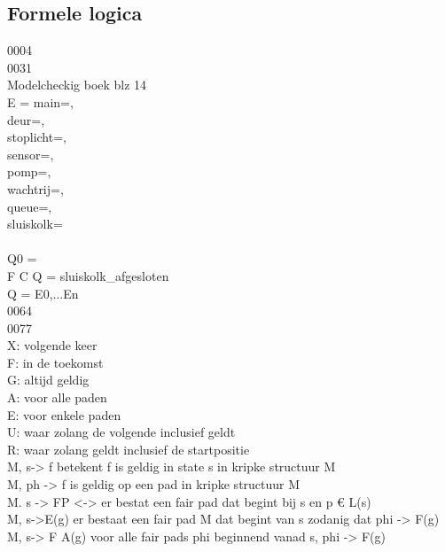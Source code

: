 


\subsection{Formele logica}

0004 \\
0031 \\
Modelcheckig boek blz 14 \\
E = {main={}, \\
	deur={}, \\
	stoplicht={}, \\
	sensor={}, \\
	pomp={}, \\
	wachtrij={}, \\
	queue={}, \\
	sluiskolk={} \\
} \\
Q0 = \\
F C Q = sluiskolk_afgesloten \\
Q = E0,...En \\
0064 \\
0077 \\



X: volgende keer \\
F: in de toekomst \\
G: altijd geldig \\
A: voor alle paden \\
E: voor enkele paden \\
U: waar zolang de volgende inclusief geldt \\
R: waar zolang geldt inclusief de startpositie \\

M, s-> f betekent f is geldig in state s in kripke structuur M \\
M, ph -> f is geldig op een pad in kripke structuur M \\
M. s -> FP <-> er bestat een fair pad dat begint bij s en p € L(s) \\
M, s->E(g) er bestaat een fair pad M dat begint van s zodanig dat phi -> F(g) \\
M, s-> F A(g) voor alle fair pads phi beginnend vanad s,  phi -> F(g) \\



